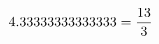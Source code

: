 \documentclass[preview]{standalone}
\begin{document}
\begin{align*}
\special{dvisvgm:raw <g id='unique000'>}4.33333333333333 = \frac{13}{3}\special{dvisvgm:raw </g>}
\end{align*}
\end{document}

